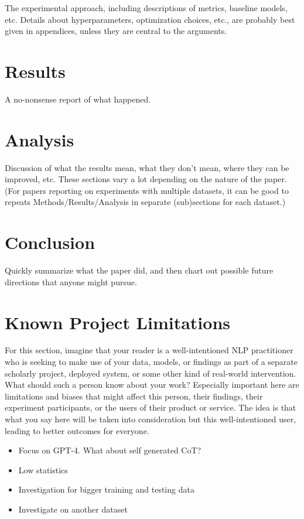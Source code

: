 \documentclass[11pt]{article}
\begin{document}
The experimental approach, including descriptions of metrics, baseline models, etc. Details about hyperparameters, optimization choices, etc., are probably best given in appendices, unless they are central to the arguments.

\section{Results} 

A no-nonsense report of what happened.

\section{Analysis} 

Discussion of what the results mean, what they don’t mean, where they can be improved, etc. These sections vary a lot depending on the nature of the paper. (For papers reporting on experiments with multiple datasets, it can be good to repeats Methods/Results/Analysis in separate (sub)sections for each dataset.)

\section{Conclusion} 

Quickly summarize what the paper did, and then chart out possible future directions that anyone might pursue.

\section*{Known Project Limitations}

For this section, imagine that your reader is a well-intentioned NLP practitioner who is seeking to make use of your data, models, or findings as part of a separate scholarly project, deployed system, or some other kind of real-world intervention. What should such a person know about your work? Especially important here are limitations and biases that might affect this person, their findings, their experiment participants, or the users of their product or service. The idea is that what you say here will be taken into consideration but this well-intentioned user, leading to better outcomes for everyone.

\begin{itemize}
  \item Focus on GPT-4. What about self generated CoT?
  \item Low statistics
  \item Investigation for bigger training and testing data
  \item Investigate on another dataset
\end{itemize}
\end{document}
